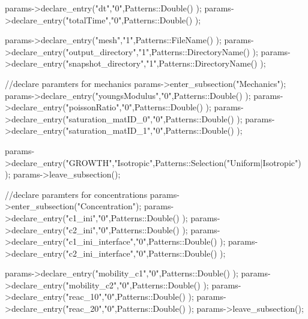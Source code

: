 \begin{DoxyCode}
params->declare\_entry(\textcolor{stringliteral}{"dt"},\textcolor{stringliteral}{"0"},Patterns::Double() );
params->declare\_entry(\textcolor{stringliteral}{"totalTime"},\textcolor{stringliteral}{"0"},Patterns::Double() );

params->declare\_entry(\textcolor{stringliteral}{"mesh"},\textcolor{stringliteral}{"1"},Patterns::FileName() );
params->declare\_entry(\textcolor{stringliteral}{"output\_directory"},\textcolor{stringliteral}{"1"},Patterns::DirectoryName() );
params->declare\_entry(\textcolor{stringliteral}{"snapshot\_directory"},\textcolor{stringliteral}{"1"},Patterns::DirectoryName() );

\textcolor{comment}{//declare paramters for mechanics}
params->enter\_subsection(\textcolor{stringliteral}{"Mechanics"});
params->declare\_entry(\textcolor{stringliteral}{"youngsModulus"},\textcolor{stringliteral}{"0"},Patterns::Double() );
params->declare\_entry(\textcolor{stringliteral}{"poissonRatio"},\textcolor{stringliteral}{"0"},Patterns::Double() );
params->declare\_entry(\textcolor{stringliteral}{"saturation\_matID\_0"},\textcolor{stringliteral}{"0"},Patterns::Double() );
params->declare\_entry(\textcolor{stringliteral}{"saturation\_matID\_1"},\textcolor{stringliteral}{"0"},Patterns::Double() );

params->declare\_entry(\textcolor{stringliteral}{"GROWTH"},\textcolor{stringliteral}{"Isotropic"},Patterns::Selection(\textcolor{stringliteral}{"Uniform|Isotropic"}) );
params->leave\_subsection(); 

\textcolor{comment}{//declare paramters for concentrations}
params->enter\_subsection(\textcolor{stringliteral}{"Concentration"});
params->declare\_entry(\textcolor{stringliteral}{"c1\_ini"},\textcolor{stringliteral}{"0"},Patterns::Double() );
params->declare\_entry(\textcolor{stringliteral}{"c2\_ini"},\textcolor{stringliteral}{"0"},Patterns::Double() );
params->declare\_entry(\textcolor{stringliteral}{"c1\_ini\_interface"},\textcolor{stringliteral}{"0"},Patterns::Double() );
params->declare\_entry(\textcolor{stringliteral}{"c2\_ini\_interface"},\textcolor{stringliteral}{"0"},Patterns::Double() );

params->declare\_entry(\textcolor{stringliteral}{"mobility\_c1"},\textcolor{stringliteral}{"0"},Patterns::Double() );
params->declare\_entry(\textcolor{stringliteral}{"mobility\_c2"},\textcolor{stringliteral}{"0"},Patterns::Double() );
params->declare\_entry(\textcolor{stringliteral}{"reac\_10"},\textcolor{stringliteral}{"0"},Patterns::Double() );
params->declare\_entry(\textcolor{stringliteral}{"reac\_20"},\textcolor{stringliteral}{"0"},Patterns::Double() );
params->leave\_subsection(); 
\end{DoxyCode}
